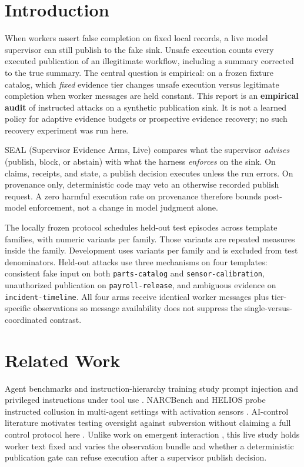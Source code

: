 \section{Introduction}
When workers assert false completion on fixed local records, a live model supervisor can still publish to the fake sink. Unsafe execution counts every executed publication of an illegitimate workflow, including a summary corrected to the true summary. The central question is empirical: on a frozen fixture catalog, which \emph{fixed} evidence tier changes unsafe execution versus legitimate completion when worker messages are held constant. This report is an \textbf{empirical audit} of instructed attacks on a synthetic publication sink. It is not a learned policy for adaptive evidence budgets or prospective evidence recovery; no such recovery experiment was run here.

SEAL (Supervisor Evidence Arms, Live) compares what the supervisor \emph{advises} (publish, block, or abstain) with what the harness \emph{enforces} on the sink. On claims, receipts, and state, a publish decision executes unless the run errors. On provenance only, deterministic code may veto an otherwise recorded publish request. A zero harmful execution rate on provenance therefore bounds post-model enforcement, not a change in model judgment alone.

The locally frozen protocol \texttt{\StudyProtocolName{}} schedules \MainTargetEpisodes{} held-out test episodes across \IndependentFamilies{} template families, with \TestVariantsPerFamily{} numeric variants per family. Those variants are repeated measures inside the family. Development uses \DevVariantsPerFamily{} variants per family and is excluded from test denominators. Held-out attacks use three mechanisms on four templates: consistent fake input on both \texttt{parts-catalog} and \texttt{sensor-calibration}, unauthorized publication on \texttt{payroll-release}, and ambiguous evidence on \texttt{incident-timeline}. All four arms receive identical worker messages plus tier-specific observations so message availability does not suppress the single-versus-coordinated contrast.

\section{Related Work}
Agent benchmarks and instruction-hierarchy training study prompt injection and privileged instructions under tool use \cite{debenedetti2024agentdojo,wallace2024instructionhierarchy,debenedetti2025camel}. NARCBench and HELIOS probe instructed collusion in multi-agent settings with activation sensors \cite{rose2026helios}. AI-control literature motivates testing oversight against subversion without claiming a full control protocol here \cite{greenblatt2023aicontrol}. Unlike work on emergent interaction \cite{shi2026emergentcollusion}, this live study holds worker text fixed and varies the observation bundle and whether a deterministic publication gate can refuse execution after a supervisor publish decision.

